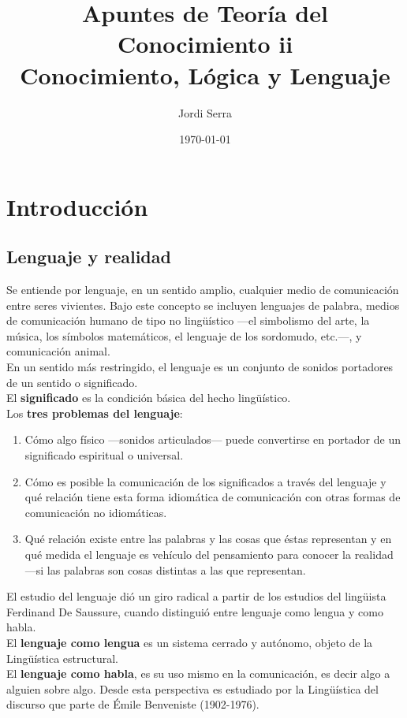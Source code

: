 \documentclass[a4paper, 11pt, twocolumn, spanish]{article}
\author{Jordi Serra}
\date{\today}
\title{Apuntes de Teoría del Conocimiento ii\\\medskip
\large Conocimiento, Lógica y Lenguaje}
\begin{document}
\maketitle
\tableofcontents


\section{Introducción}
\label{sec:orgf153df7}
\subsection{Lenguaje y realidad}
\label{sec:org3c330d2}
Se entiende por lenguaje, en un sentido amplio, cualquier medio de
comunicación entre seres vivientes. Bajo este concepto se incluyen
lenguajes de palabra, medios de comunicación humano de tipo no
lingüístico —el simbolismo del arte, la música, los símbolos
matemáticos, el lenguaje de los sordomudo, etc.—, y comunicación
animal.\\

En un sentido más restringido, el lenguaje es un conjunto de sonidos
portadores de un sentido o significado.\\
El \textbf{significado} es la condición básica del hecho lingüístico.\\
Los \textbf{tres problemas del lenguaje}:
\begin{enumerate}
\item Cómo algo físico —sonidos articulados— puede convertirse en
portador de un significado espiritual o universal.
\item Cómo es posible la comunicación de los significados a través del
lenguaje y qué relación tiene esta forma idiomática de
comunicación con otras formas de comunicación no idiomáticas.
\item Qué relación existe entre las palabras y las cosas que éstas
representan y en qué medida el lenguaje es vehículo del
pensamiento para conocer la realidad —si las palabras son cosas
distintas a las que representan.
\end{enumerate}

El estudio del lenguaje dió un giro radical a partir de los estudios
del lingüista Ferdinand De Saussure, cuando distinguió entre lenguaje
como lengua y como habla.\\
El \textbf{lenguaje como lengua} es un sistema cerrado y autónomo, objeto de
la Lingüística estructural.\\
El \textbf{lenguaje como habla}, es su uso mismo en la comunicación, es decir
algo a alguien sobre algo. Desde esta perspectiva es estudiado por la
Lingüística del discurso que parte de Émile Benveniste (1902-1976).\\
\end{document}
